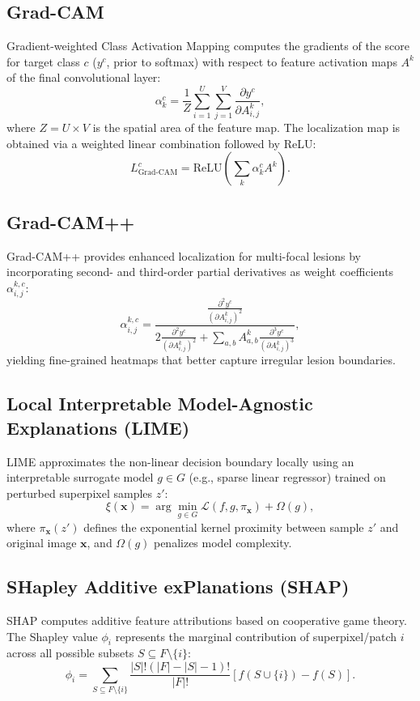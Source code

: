 \documentclass[conference]{IEEEtran}
\begin{document}
\subsection{Grad-CAM}
Gradient-weighted Class Activation Mapping computes the gradients of the score for target class $c$ ($y^c$, prior to softmax) with respect to feature activation maps $A^k$ of the final convolutional layer:
\begin{equation}
\alpha_k^c = \frac{1}{Z} \sum_{i=1}^U \sum_{j=1}^V \frac{\partial y^c}{\partial A_{i,j}^k},
\end{equation}
where $Z = U \times V$ is the spatial area of the feature map. The localization map is obtained via a weighted linear combination followed by ReLU:
\begin{equation}
L_{\text{Grad-CAM}}^c = \text{ReLU}\left( \sum_k \alpha_k^c A^k \right).
\end{equation}

\subsection{Grad-CAM++}
Grad-CAM++ provides enhanced localization for multi-focal lesions by incorporating second- and third-order partial derivatives as weight coefficients $\alpha_{i,j}^{k,c}$:
\begin{equation}
\alpha_{i,j}^{k,c} = \frac{\frac{\partial^2 y^c}{(\partial A_{i,j}^k)^2}}{2\frac{\partial^2 y^c}{(\partial A_{i,j}^k)^2} + \sum_{a,b} A_{a,b}^k \frac{\partial^3 y^c}{(\partial A_{i,j}^k)^3}},
\end{equation}
yielding fine-grained heatmaps that better capture irregular lesion boundaries.

\subsection{Local Interpretable Model-Agnostic Explanations (LIME)}
LIME approximates the non-linear decision boundary locally using an interpretable surrogate model $g \in G$ (e.g., sparse linear regressor) trained on perturbed superpixel samples $z'$:
\begin{equation}
\xi(\mathbf{x}) = \arg\min_{g \in G} \mathcal{L}(f, g, \pi_{\mathbf{x}}) + \Omega(g),
\end{equation}
where $\pi_{\mathbf{x}}(z')$ defines the exponential kernel proximity between sample $z'$ and original image $\mathbf{x}$, and $\Omega(g)$ penalizes model complexity.

\subsection{SHapley Additive exPlanations (SHAP)}
SHAP computes additive feature attributions based on cooperative game theory. The Shapley value $\phi_i$ represents the marginal contribution of superpixel/patch $i$ across all possible subsets $S \subseteq F \setminus \{i\}$:
\begin{equation}
\phi_i = \sum_{S \subseteq F \setminus \{i\}} \frac{|S|!(|F| - |S| - 1)!}{|F|!} \left[ f(S \cup \{i\}) - f(S) \right].
\end{equation}
\end{document}
